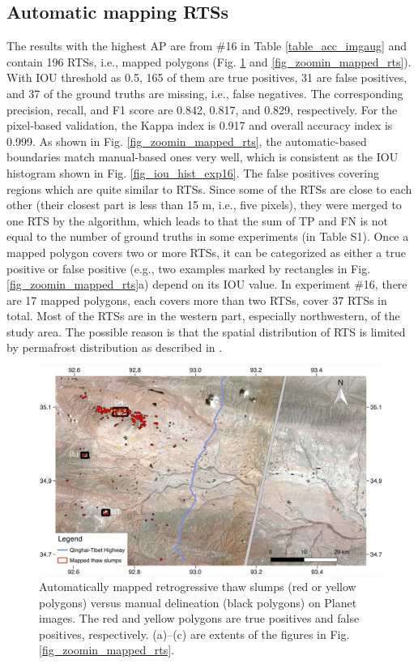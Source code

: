 \documentclass[preprint,12pt,authoryear]{elsarticle}
\begin{document}
\subsection{Automatic mapping RTSs }
\label{subsub_mapped_rts}

The results with the highest AP are from \#16 in Table \ref{table_acc_imgaug} and contain 196 RTSs, i.e., mapped polygons (Fig. \ref{fig_mapped_rts} and \ref{fig_zoomin_mapped_rts}). With IOU threshold as 0.5, 165 of them are true positives, 31 are false positives, and 37 of the ground truths are missing, i.e., false negatives. The corresponding precision, recall, and F1 score are 0.842, 0.817, and 0.829, respectively. For the pixel-based validation, the Kappa index is 0.917 and overall accuracy index is 0.999. As shown in Fig. \ref{fig_zoomin_mapped_rts}, the automatic-based boundaries match manual-based ones very well, which is consistent as the IOU histogram shown in Fig. \ref{fig_iou_hist_exp16}. The false positives covering regions which are quite similar to RTSs. Since some of the RTSs are close to each other (their closest part is less than 15 m, i.e., five pixels), they were merged to one RTS by the algorithm, which leads to that the sum of TP and FN is not equal to the number of ground truths in some experiments (in Table S1). Once a mapped polygon covers two or more RTSs, it can be categorized as either a true positive or false positive (e.g., two examples marked by rectangles in Fig. \ref{fig_zoomin_mapped_rts}a) depend on its IOU value. In experiment \#16, there are 17 mapped polygons, each covers more than two RTSs, cover 37 RTSs in total. Most of the RTSs are in the western part, especially northwestern, of the study area. The possible reason is that the spatial distribution of RTS is limited by permafrost distribution as described in \citealp{yin2017effects}.

\begin{figure}
	\centering
	\includegraphics[width=14cm]{figures/whole_area_mapped_trim.jpg}
	\caption{Automatically mapped retrogressive thaw slumps (red or yellow polygons) versus manual delineation (black polygons) on Planet images. The red and yellow polygons are true positives and false positives, respectively.  (a)--(c) are extents of the figures in Fig. \ref{fig_zoomin_mapped_rts}.}
	\label{fig_mapped_rts}
\end{figure}
\end{document}
